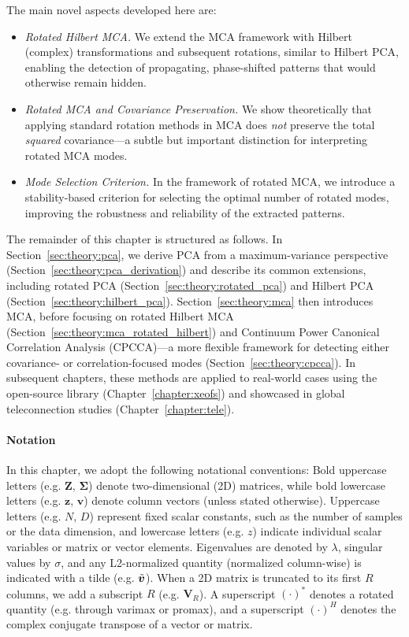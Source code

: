 The main novel aspects developed here are: 
\begin{itemize}[leftmargin=2em] 
    \item \emph{Rotated Hilbert MCA.} We extend the MCA framework with Hilbert (complex) transformations and subsequent rotations, similar to Hilbert PCA, enabling the detection of propagating, phase-shifted patterns that would otherwise remain hidden.
    \item \emph{Rotated MCA and Covariance Preservation.} We show theoretically that applying standard rotation methods in MCA does \emph{not} preserve the total \emph{squared} covariance—a subtle but important distinction for interpreting rotated MCA modes.
    \item \emph{Mode Selection Criterion.} In the framework of rotated MCA, we introduce a stability-based criterion for selecting the optimal number of rotated modes, improving the robustness and reliability of the extracted patterns.
\end{itemize}

The remainder of this chapter is structured as follows. In Section~\ref{sec:theory:pca}, we derive PCA from a maximum-variance perspective (Section~\ref{sec:theory:pca_derivation}) and describe its common extensions, including rotated PCA (Section~\ref{sec:theory:rotated_pca}) and Hilbert PCA (Section~\ref{sec:theory:hilbert_pca}). Section~\ref{sec:theory:mca} then introduces MCA, before focusing on rotated Hilbert MCA (Section~\ref{sec:theory:mca_rotated_hilbert}) and Continuum Power Canonical Correlation Analysis (CPCCA)---a more flexible framework for detecting either covariance- or correlation-focused modes (Section~\ref{sec:theory:cpcca}). In subsequent chapters, these methods are applied to real-world cases using the open-source  library (Chapter~\ref{chapter:xeofs}) and showcased in global teleconnection studies (Chapter~\ref{chapter:tele}).

\paragraph{Notation} In this chapter, we adopt the following notational conventions: Bold uppercase letters (e.g. $\bm{Z}$, $\bm{\Sigma}$) denote two-dimensional (2D) matrices, while bold lowercase letters (e.g. $\bm{z}$, $\bm{v}$) denote column vectors (unless stated otherwise). Uppercase letters (e.g. $N$, $D$) represent fixed scalar constants, such as the number of samples or the data dimension, and lowercase letters (e.g. $z$) indicate individual scalar variables or matrix or vector elements. Eigenvalues are denoted by $\lambda$, singular values by $\sigma$, and any L2-normalized quantity (normalized column-wise) is indicated with a tilde (e.g. $\tilde{\bm{v}}$). When a 2D matrix is truncated to its first $R$ columns, we add a subscript $R$ (e.g. $\bm{V}_R$). A superscript $(\cdot)^*$ denotes a rotated quantity (e.g. through varimax or promax), and a superscript $(\cdot)^H$ denotes the complex conjugate transpose of a vector or matrix.

